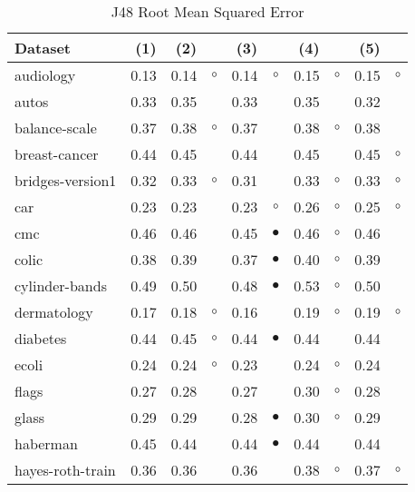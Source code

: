 \newpage
{\centering \footnotesize \begin{longtable}{lrr@{\hspace{0.1cm}}cr@{\hspace{0.1cm}}cr@{\hspace{0.1cm}}cr@{\hspace{0.1cm}}c}
\caption{\label{j48rmse}J48 Root Mean Squared Error}
\\
\hline
Dataset & (1)& (2) & & (3) & & (4) & & (5) & \\
\hline
audiology & 0.13 & 0.14 &   $\circ$ & 0.14 &   $\circ$ & 0.15 &   $\circ$ & 0.15 &   $\circ$\\
autos & 0.33 & 0.35 &           & 0.33 &           & 0.35 &           & 0.32 &          \\
balance-scale & 0.37 & 0.38 &   $\circ$ & 0.37 &           & 0.38 &   $\circ$ & 0.38 &          \\
breast-cancer & 0.44 & 0.45 &           & 0.44 &           & 0.45 &           & 0.45 &   $\circ$\\
bridges-version1 & 0.32 & 0.33 &   $\circ$ & 0.31 &           & 0.33 &   $\circ$ & 0.33 &   $\circ$\\
car & 0.23 & 0.23 &           & 0.23 &   $\circ$ & 0.26 &   $\circ$ & 0.25 &   $\circ$\\
cmc & 0.46 & 0.46 &           & 0.45 & $\bullet$ & 0.46 &   $\circ$ & 0.46 &          \\
colic & 0.38 & 0.39 &           & 0.37 & $\bullet$ & 0.40 &   $\circ$ & 0.39 &          \\
cylinder-bands & 0.49 & 0.50 &           & 0.48 & $\bullet$ & 0.53 &   $\circ$ & 0.50 &          \\
dermatology & 0.17 & 0.18 &   $\circ$ & 0.16 &           & 0.19 &   $\circ$ & 0.19 &   $\circ$\\
diabetes & 0.44 & 0.45 &   $\circ$ & 0.44 & $\bullet$ & 0.44 &           & 0.44 &          \\
ecoli & 0.24 & 0.24 &   $\circ$ & 0.23 &           & 0.24 &   $\circ$ & 0.24 &          \\
flags & 0.27 & 0.28 &           & 0.27 &           & 0.30 &   $\circ$ & 0.28 &          \\
glass & 0.29 & 0.29 &           & 0.28 & $\bullet$ & 0.30 &   $\circ$ & 0.29 &          \\
haberman & 0.45 & 0.44 &           & 0.44 & $\bullet$ & 0.44 &           & 0.44 &          \\
hayes-roth-train & 0.36 & 0.36 &           & 0.36 &           & 0.38 &   $\circ$ & 0.37 &   $\circ$\\

\end{longtable}}
